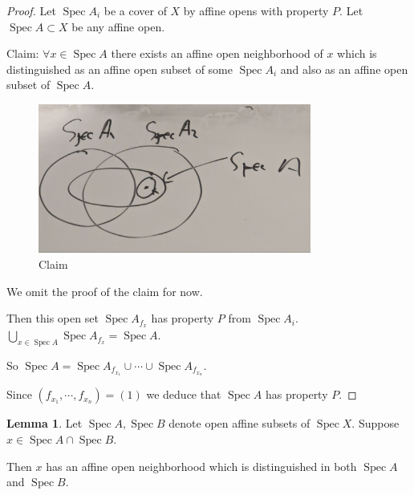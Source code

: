 \documentclass{article}
\theoremstyle{definition}
\newtheorem{lemma}[theorem]{Lemma}
\begin{document}
    \begin{proof}
        Let \(\operatorname{Spec} A_i\) be a cover of \(X\) by affine opens with property \(P\). Let \(\operatorname{Spec} A \subset X\) be any affine open.

        Claim: \(\forall x\in \operatorname{Spec} A\) there exists an affine open neighborhood of \(x\) which is distinguished as an affine open subset of some \(\operatorname{Spec} A_i\) and also as an affine open subset of \(\operatorname{Spec} A\).

        \begin{figure}[H]
            \centering
            \includegraphics[width=0.8\textwidth]{img/commlemma}
            \caption{Claim}
        \end{figure}

        We omit the proof of the claim for now.

        Then this open set \(\operatorname{Spec} A_{f_x}\) has property \(P\) from \(\operatorname{Spec} A_i\). \(\bigcup_{x\in \operatorname{Spec} A} \operatorname{Spec} A_{f_x} = \operatorname{Spec} A\).

        So \(\operatorname{Spec} A = \operatorname{Spec} A_{f_{x_1}} \cup \cdots \cup \operatorname{Spec} A_{f_{x_n}}\).
        
        Since \((f_{x_1}, \cdots , f_{x_n}) = (1)\) we deduce that \(\operatorname{Spec} A\) has property \(P\).
    \end{proof}

    \begin{lemma}
        Let \(\operatorname{Spec} A, \operatorname{Spec} B\) denote open affine subsets of \(\operatorname{Spec} X\). Suppose \(x\in \operatorname{Spec} A\cap \operatorname{Spec} B\).

        Then \(x\) has an affine open neighborhood which is distinguished in both \(\operatorname{Spec} A\) and \(\operatorname{Spec} B\).
    \end{lemma}
\end{document}
